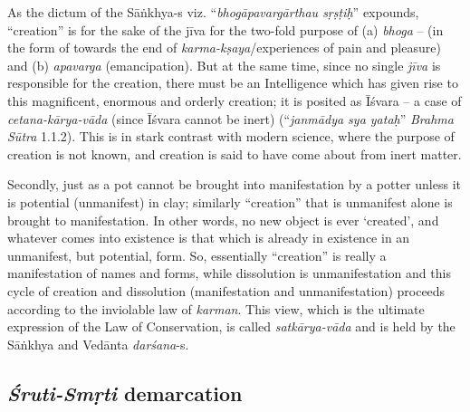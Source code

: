 As the dictum of the Sāṅkhya-s viz. ``{\sl bhogāpavargārthau sṛṣṭiḥ}'' expounds, ``creation'' is for the sake of the jīva for the two-fold purpose of (a) {\sl bhoga} -- (in the form of towards the end of {\sl karma-kṣaya}/experiences of pain and pleasure) and (b) {\sl apavarga} (emancipation). But at the same time, since no single {\sl jīva} is responsible for the creation, there must be an Intelligence which has given rise to this magniﬁcent, enormous and orderly creation; it is posited as Īśvara -- a case of {\sl cetana-kārya-vāda} (since Īśvara cannot be inert) (``{\sl janmādya sya yataḥ}'' {\sl Brahma Sūtra} 1.1.2). This is in stark contrast with modern science, where the purpose of creation is not known, and creation is said to have come about from inert matter. 

Secondly, just as a pot cannot be brought into manifestation by a potter unless it is potential (unmanifest) in clay; similarly ``creation'' that is unmanifest alone is brought to manifestation. In other words, no new object is ever `created', and whatever comes into existence is that which is already in existence in an unmanifest, but potential, form. So, essentially ``creation'' is really a manifestation of names and forms, while dissolution is unmanifestation and this cycle of creation and dissolution (manifestation and unmanifestation) proceeds according to the inviolable law of {\sl karman}. This view, which is the ultimate expression of the Law of Conservation, is called {\sl satkārya-vāda} and is held by the Sāṅkhya and Vedānta {\sl darśana}-s.\\[-20pt]

\subsection{{{\sl\bfseries Śruti-Smṛti}\relax} demarcation}\label{art12-sec2.4}

